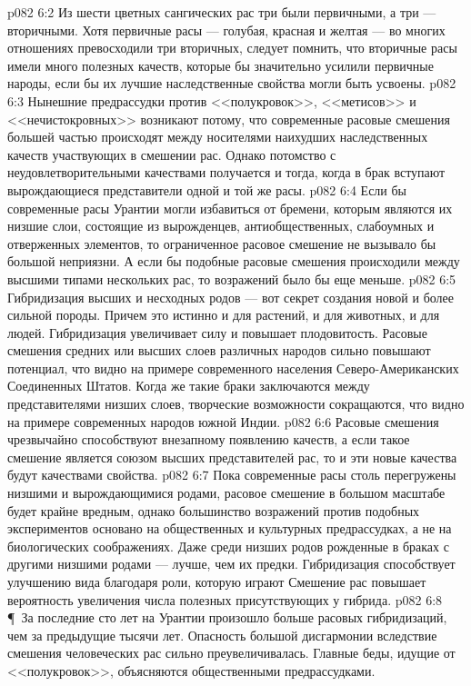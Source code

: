 \vs p082 6:2 Из шести цветных сангических рас три были первичными, а три --- вторичными. Хотя первичные расы --- голубая, красная и желтая --- во многих отношениях превосходили три вторичных, следует помнить, что вторичные расы имели много полезных качеств, которые бы значительно усилили первичные народы, если бы их лучшие наследственные свойства могли быть усвоены.
\vs p082 6:3 Нынешние предрассудки против <<полукровок>>, <<метисов>> и <<нечистокровных>> возникают потому, что современные расовые смешения большей частью происходят между носителями наихудших наследственных качеств участвующих в смешении рас. Однако потомство с неудовлетворительными качествами получается и тогда, когда в брак вступают вырождающиеся представители одной и той же расы.
\vs p082 6:4 Если бы современные расы Урантии могли избавиться от бремени, которым являются их низшие слои, состоящие из вырожденцев, антиобщественных, слабоумных и отверженных элементов, то ограниченное расовое смешение не вызывало бы большой неприязни. А если бы подобные расовые смешения происходили между высшими типами нескольких рас, то возражений было бы еще меньше.
\vs p082 6:5 Гибридизация высших и несходных родов --- вот секрет создания новой и более сильной породы. Причем это истинно и для растений, и для животных, и для людей. Гибридизация увеличивает силу и повышает плодовитость. Расовые смешения средних или высших слоев различных народов сильно повышают  потенциал, что видно на примере современного населения Северо\hyp{}Американских Соединенных Штатов. Когда же такие браки заключаются между представителями низших слоев, творческие возможности сокращаются, что видно на примере современных народов южной Индии.
\vs p082 6:6 Расовые смешения чрезвычайно способствуют внезапному появлению  качеств, а если такое смешение является союзом высших представителей рас, то и эти новые качества будут качествами  свойства.
\vs p082 6:7 Пока современные расы столь перегружены низшими и вырождающимися родами, расовое смешение в большом масштабе будет крайне вредным, однако большинство возражений против подобных экспериментов основано на общественных и культурных предрассудках, а не на биологических соображениях. Даже среди низших родов рожденные в браках с другими низшими родами --- лучше, чем их предки. Гибридизация способствует улучшению вида благодаря роли, которую играют  Смешение рас повышает вероятность увеличения числа полезных  присутствующих у гибрида.
\vs p082 6:8 \P\ За последние сто лет на Урантии произошло больше расовых гибридизаций, чем за предыдущие тысячи лет. Опасность большой дисгармонии вследствие смешения человеческих рас сильно преувеличивалась. Главные беды, идущие от <<полукровок>>, объясняются общественными предрассудками.
